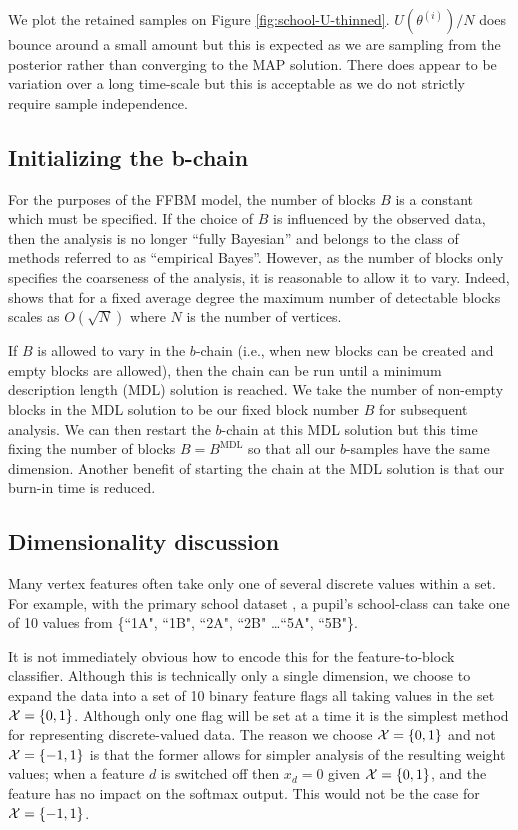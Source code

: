 We plot the retained samples on Figure \ref{fig:school-U-thinned}. $U(\theta^{(i)})/N$ does bounce around a small amount but this is expected as we are sampling from the posterior rather than converging to the MAP solution. There does appear to be variation over a long time-scale but this is acceptable as we do not strictly require sample independence.
\FloatBarrier
\subsection{Initializing the b-chain}

For the purposes of the FFBM model, the number of blocks $B$ is a constant 
which must be specified. If the choice of $B$ is influenced 
by the observed data, then the analysis is no longer ``fully Bayesian''
and belongs to the class of methods referred to as ``empirical Bayes''.
However, as the number of blocks only specifies the coarseness of the 
analysis, it is reasonable to allow it to vary. Indeed, 
\citet{peixoto-determine-B} shows that for a fixed 
average degree the maximum number of detectable blocks scales 
as $O(\sqrt{N})$ where $N$ is the number of vertices.

If $B$ is allowed to vary in the $b$-chain (i.e.,
when new blocks can be created and empty blocks are allowed),
then the chain can be run until a minimum description 
length (MDL) solution is reached. We take the number of non-empty blocks 
in the MDL solution to be our fixed block number $B$ for subsequent analysis. 
We can then restart the $b$-chain at this MDL solution 
but this time fixing the number of blocks $B=B^{\textrm{MDL}}$ so that all our $b$-samples have the same dimension.
Another benefit of starting the chain at the MDL solution is that our burn-in time is reduced.

\subsection{Dimensionality discussion}
\label{appdx:dimension}

Many vertex features often take only one of several discrete values within a set. For example, with the primary school dataset \cite{schools}, a pupil's school-class can take one of 10 values from \{``1A", ``1B", ``2A", ``2B" \dots ``5A", ``5B"\}.

It is not immediately obvious how to encode this for the feature-to-block classifier. Although this is technically only a single dimension, we choose to expand the data into a set of 10 binary feature flags all taking values in the set $\mathcal{X} = \{0, 1\}$. Although only one flag will be set at a time it is the simplest method for representing discrete-valued data. The reason we choose $\mathcal{X}=\{0, 1\}$ and not $\mathcal{X} = \{-1, 1\}$ is that the former allows for simpler analysis of the resulting weight values; when a feature $d$ is switched off then $x_{d}=0$ given $\mathcal{X} = \{0, 1\}$, and the feature has no impact on the softmax output. This would not be the case for $\mathcal{X} = \{-1, 1\}$.

